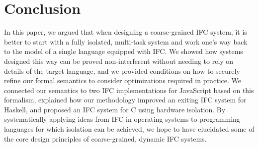 \section{Conclusion}
\label{sec:conclusion}

In this paper, we argued that when designing a coarse-grained IFC
system, it is better to start with a fully isolated, multi-task system
and work one's way back to the model of a single language equipped
with IFC.  We showed
how systems designed this way can be proved non-interferent
without needing to rely on details of the target language, and
we provided conditions on how to securely refine our formal semantics to
consider optimizations required in practice.  We connected our semantics
to two IFC implementations for JavaScript based on this formalism,
explained how our methodology improved an exiting IFC system for Haskell,
and proposed
an IFC system for C using hardware isolation.
By systematically applying ideas from IFC in operating systems to
programming languages for which isolation can be achieved,
we hope to have elucidated some of the core design principles of coarse-grained,
dynamic IFC systems.


